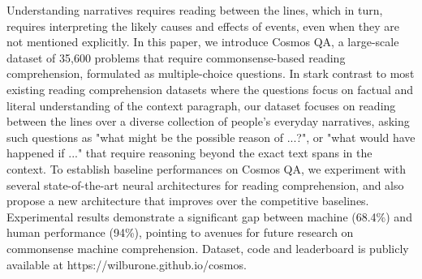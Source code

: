 Understanding narratives requires reading between the lines, which in turn, requires interpreting the likely causes and effects of events, even when they are not mentioned explicitly. In this paper, we introduce Cosmos QA, a large-scale dataset of 35,600 problems that require commonsense-based reading comprehension, formulated as multiple-choice questions. In stark contrast to most existing reading comprehension datasets where the questions focus on factual and literal understanding of the context paragraph, our dataset focuses on reading between the lines over a diverse collection of people's everyday narratives, asking such questions as "what might be the possible reason of ...?", or "what would have happened if ..." that require reasoning beyond the exact text spans in the context. To establish baseline performances on Cosmos QA, we experiment with several state-of-the-art neural architectures for reading comprehension, and also propose a new architecture that improves over the competitive baselines. Experimental results demonstrate a significant gap between machine (68.4\%) and human performance (94\%), pointing to avenues for future research on commonsense machine comprehension. Dataset, code and leaderboard is publicly available at https://wilburone.github.io/cosmos.
